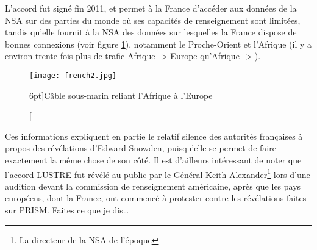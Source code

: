 L'accord fut signé fin 2011\citep{lustre}, et permet à la France
d'accéder aux données de la NSA sur des parties du monde où ses capacités de renseignement
sont limitées, tandis qu'elle fournit à la NSA des données sur lesquelles la
France dispose de bonnes connexions (voir figure \ref{fig:french2}), notamment
le Proche-Orient et l'Afrique (il y a environ trente fois plus de trafic Afrique -> Europe qu'Afrique ->
\EUA).

\vspace{0.7cm}
\begin{figure}
\texttt{[image: french2.jpg]}
\caption[Câble sous-marin reliant l'Afrique à l'Europe][6pt]{Câble sous-marin
reliant l'Afrique à l'Europe}
\label{fig:french2}
\end{figure}

Ces informations expliquent en partie le relatif silence des
autorités françaises à propos des révélations d'Edward Snowden, puisqu'elle se
permet de faire exactement la même chose de son côté. Il
est d'ailleurs intéressant de noter que l'accord LUSTRE fut révélé au public par
le Général Keith Alexander\footnote{La directeur de la NSA de l'époque} lors
d'une audition devant la commission de renseignement américaine, après que les pays
européens, dont la France, ont commencé à protester contre les révélations
faites sur PRISM. Faites ce que je dis\ldots